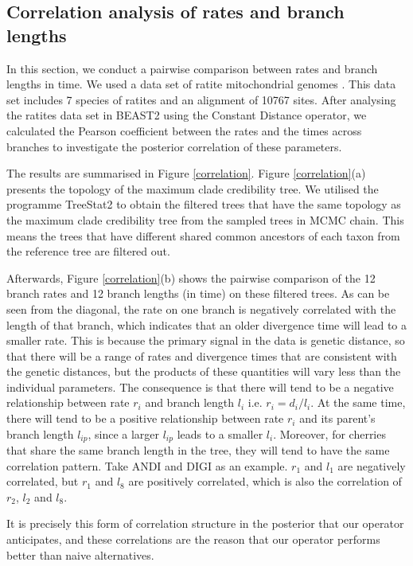 \documentclass{bmcart}
\begin{document}
\subsection*{Correlation analysis of rates and branch lengths}
In this section, we conduct a pairwise comparison between rates and branch lengths in time. We used a data set of ratite mitochondrial genomes \cite{cooper2001complete}. This data set includes 7 species of ratites and an alignment of 10767 sites. After analysing the ratites data set in BEAST2 using the Constant Distance operator, we calculated the Pearson coefficient between the rates and the times across branches to investigate the posterior correlation of these parameters. 

The results are summarised in Figure \ref{correlation}. Figure \ref{correlation}(a) presents the topology of the maximum clade credibility tree. We utilised the programme TreeStat2 \cite{TreeStat2} to obtain the filtered trees that have the same topology as the maximum clade credibility tree from the sampled trees in MCMC chain. This means the trees that have different shared common ancestors of each taxon from the reference tree are filtered out. 

Afterwards, Figure \ref{correlation}(b) shows the pairwise comparison of the 12 branch rates and 12 branch lengths (in time) on these filtered trees. As can be seen from the diagonal, the rate on one branch is negatively correlated with the length of that branch, which indicates that an older divergence time will lead to a smaller rate. This is because the primary signal in the data is genetic distance, so that there will be a range of rates and divergence times that are consistent with the genetic distances, but the products of these quantities will vary less than the individual parameters. The consequence is that there will tend to be a negative relationship between rate ${r_i}$ and branch length ${l_i}$ i.e. ${r_i} = {d_i}/{l_i}$. At the same time, there will tend to be a positive relationship between rate ${r_i}$ and its parent's branch length ${l_{ip}}$, since a larger ${l_{ip}}$ leads to a smaller ${l_i}$. Moreover, for cherries that share the same branch length in the tree, they will tend to have the same correlation pattern. Take ANDI and DIGI as an example. ${r_1}$ and ${l_1}$ are negatively correlated, but ${r_1}$ and ${l_8}$ are positively correlated, which is also the correlation of ${r_2}$, ${l_2}$ and ${l_8}$. 

It is precisely this form of correlation structure in the posterior that our operator anticipates, and these correlations are the reason that our operator performs better than naive alternatives.
\end{document}
